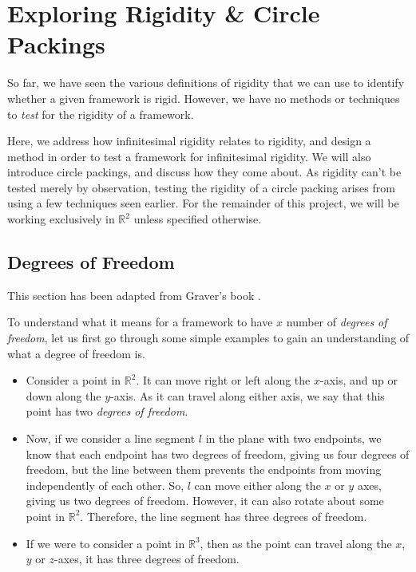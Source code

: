 \chapter{Exploring Rigidity \& Circle Packings}  %

\begin{flushleft}
So far, we have seen the various definitions of rigidity that we can use to identify whether a given framework is rigid. However, we have no methods or techniques to \textit{test} for the rigidity of a framework. 
\end{flushleft}

\begin{flushleft}
Here, we address how infinitesimal rigidity relates to rigidity, and design a method in order to test a framework for infinitesimal rigidity. We will also introduce circle packings, and discuss how they come about. As rigidity can't be tested merely by observation, testing the rigidity of a circle packing arises from using a few techniques seen earlier. For the remainder of this project, we will be working exclusively in $\mathbb{R}^2$ unless specified otherwise.
\end{flushleft}

\section{Degrees of Freedom}

\noindent
This section has been adapted from Graver's book \cite{counting_frameworks}.

\begin{flushleft}
To understand what it means for a framework to have $x$ number of \textit{degrees of freedom}, let us first go through some simple examples to gain an understanding of what a degree of freedom is.

\begin{itemize}
    \item Consider a point in $\mathbb{R}^2$. It can move right or left along the $x$-axis, and up or down along the $y$-axis. As it can travel along either axis, we say that this point has two \textit{degrees of freedom}. 
    \item Now, if we consider a line segment $l$ in the plane with two endpoints, we know that each endpoint has two degrees of freedom, giving us four degrees of freedom, but the line between them prevents the endpoints from moving independently of each other. So, $l$ can move either along the $x$ or $y$ axes, giving us two degrees of freedom. However, it can also rotate about some point in $\mathbb{R}^2$. Therefore, the line segment has three degrees of freedom.
    \item If we were to consider a point in $\mathbb{R}^3$, then as the point can travel along the $x$, $y$ or $z$-axes, it has three degrees of freedom. 
\end{itemize}
\end{flushleft}


